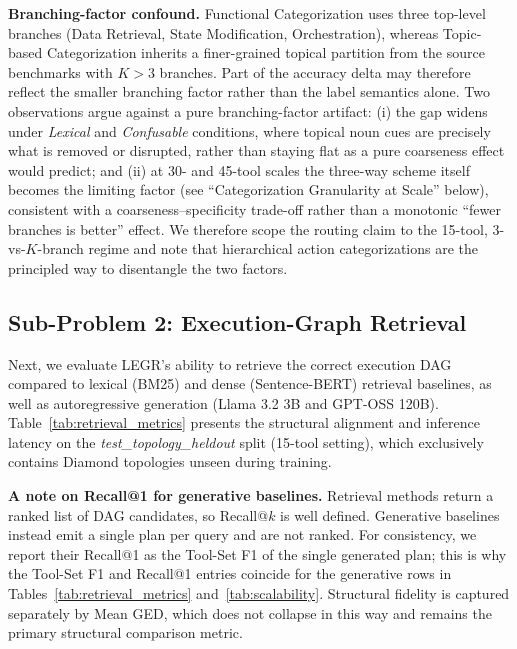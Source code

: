 \documentclass{article}
\begin{document}
\textbf{Branching-factor confound.} Functional Categorization uses three top-level branches (Data Retrieval, State Modification, Orchestration), whereas Topic-based Categorization inherits a finer-grained topical partition from the source benchmarks with $K>3$ branches. Part of the accuracy delta may therefore reflect the smaller branching factor rather than the label semantics alone. Two observations argue against a pure branching-factor artifact: (i) the gap widens under \textit{Lexical} and \textit{Confusable} conditions, where topical noun cues are precisely what is removed or disrupted, rather than staying flat as a pure coarseness effect would predict; and (ii) at 30- and 45-tool scales the three-way scheme itself becomes the limiting factor (see ``Categorization Granularity at Scale'' below), consistent with a coarseness--specificity trade-off rather than a monotonic ``fewer branches is better'' effect. We therefore scope the routing claim to the 15-tool, 3-vs-$K$-branch regime and note that hierarchical action categorizations are the principled way to disentangle the two factors.

\subsection{Sub-Problem 2: Execution-Graph Retrieval}
\label{sec:results-legr}
Next, we evaluate LEGR's ability to retrieve the correct execution DAG compared to lexical (BM25) and dense (Sentence-BERT) retrieval baselines, as well as autoregressive generation (Llama 3.2 3B and GPT-OSS 120B). Table~\ref{tab:retrieval_metrics} presents the structural alignment and inference latency on the \textit{test\_topology\_heldout} split (15-tool setting), which exclusively contains Diamond topologies unseen during training.

\textbf{A note on Recall@1 for generative baselines.} Retrieval methods return a ranked list of DAG candidates, so Recall@$k$ is well defined. Generative baselines instead emit a single plan per query and are not ranked. For consistency, we report their Recall@1 as the Tool-Set F1 of the single generated plan; this is why the Tool-Set F1 and Recall@1 entries coincide for the generative rows in Tables~\ref{tab:retrieval_metrics} and~\ref{tab:scalability}. Structural fidelity is captured separately by Mean GED, which does not collapse in this way and remains the primary structural comparison metric.
\end{document}
